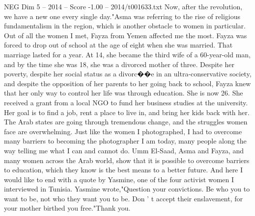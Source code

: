 \begin{textsample}{NEG Dim 5 – 2014 – Score -1.00 – 2014/t001633.txt}
Now, after the revolution, we have a new one every single day."Asma was referring to the rise of religious fundamentalism in the region, which is another obstacle to women in particular.
Out of all the women I met, Fayza from Yemen affected me the most.
Fayza was forced to drop out of school at the age of eight when she was married.
That marriage lasted for a year.
At 14, she became the third wife of a 60-year-old man, and by the time she was 18, she was a divorced mother of three.
Despite her poverty, despite her social status as a divorc{\EmojiFont �}{\EmojiFont �}e in an ultra-conservative society, and despite the opposition of her parents to her going back to school, Fayza knew that her only way to control her life was through education.
She is now 26.
She received a grant from a local NGO to fund her business studies at the university.
Her goal is to find a job, rent a place to live in, and bring her kids back with her.
The Arab states are going through tremendous change, and the struggles women face are overwhelming.
Just like the women I photographed, I had to overcome many barriers to becoming the photographer I am today, many people along the way telling me what I can and cannot do.
Umm El-Saad, Asma and Fayza, and many women across the Arab world, show that it is possible to overcome barriers to education, which they know is the best means to a better future.
And here I would like to end with a quote by Yasmine, one of the four activist women I interviewed in Tunisia.
Yasmine wrote,"Question your convictions.
Be who you to want to be, not who they want you to be.
Don ' t accept their enslavement, for your mother birthed you free."Thank you.

\end{textsample}
